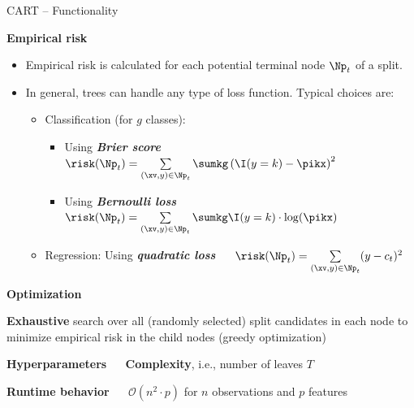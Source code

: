 \documentclass[11pt,compress,t,notes=noshow, xcolor=table]{beamer}
\newcommand{\bfit}[1]{\textbf{\textit{#1}}}
\newcommand{\highlight}[1]{\textcolor{highlightcol}{\textbf{#1}}}
\begin{document}
\begin{frame}{CART -- Functionality}

\footnotesize

\highlight{Empirical risk} \\

\begin{itemize}
  \item Empirical risk is calculated for each potential terminal node $\Np_t$
  of a split.
  \item In general, trees can handle any type of loss function. Typical choices
  are:
  \begin{itemize}
    \footnotesize
    \item Classification (for $g$ classes):
    \begin{itemize}
      \footnotesize
      \item Using \bfit{Brier score} ~~
      $\risk(\Np_t) = \sum\limits_{(\xv,y) \in \Np_t} \sumkg \left( \I(y = k)
      - \pikx \right)^2$
      \item Using \bfit{Bernoulli loss} ~~
      $\risk(\Np_t) = \sum\limits_{(\xv,y) \in \Np_t} \sumkg \I(y = k) \cdot
      \log(\pikx)$
    \end{itemize}
    \item Regression: Using \bfit{quadratic loss} ~~
    $\risk(\Np_t) = \sum\limits_{(\xv,y) \in \Np_t} (y - c_t)^2$
  \end{itemize}
\end{itemize}

\medskip

\highlight{Optimization}

\textbf{Exhaustive} search over all (randomly selected) split candidates in each 
node to minimize empirical risk in the child nodes (greedy optimization)

\medskip

\highlight{Hyperparameters} ~~ \textbf{Complexity}, i.e., 
number of leaves $T$ \\

\medskip

\highlight{Runtime behavior} ~~ $\mathcal{O}(n^2 \cdot p)$ for $n$ 
observations and $p$ features

\normalsize
  
\end{frame}

\end{document}
